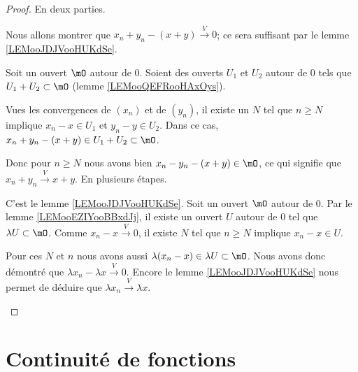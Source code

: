 \begin{proof}
	En deux parties.
	\begin{subproof}
		\spitem[\ref{ITEMooSHPAooQyEkgT}]
		Nous allons montrer que \( x_n+y_n-(x+y)\stackrel{V}{\longrightarrow}0\); ce sera suffisant par le lemme \ref{LEMooJDJVooHUKdSe}.

		Soit un ouvert \( \mO\) autour de \( 0\). Soient des ouverts \( U_1\) et \( U_2\) autour de \( 0\) tels que \( U_1+U_2\subset \mO\) (lemme \ref{LEMooQEFRooHAxOys}).

		Vues les convergences de \( (x_n)\) et de \( (y_n)\), il existe un \( N\) tel que \( n\geq N\) implique \( x_n-x\in U_1\) et \( y_n-y\in U_2\). Dans ce cas, \( x_n+y_n-(x+y)\in U_1+U_2\subset \mO\).

		Donc pour \( n\geq N\) nous avons bien \( x_n-y_n-(x+y)\in \mO\), ce qui signifie que \( x_n+y_n\stackrel{V}{\longrightarrow}x+y\).
		\spitem[\ref{ITEMooYHHYooYATzWE}]
		En plusieurs étapes.
		\begin{subproof}
			C'est le lemme \ref{LEMooJDJVooHUKdSe}.
			Soit un ouvert \( \mO\) autour de \( 0\). Par le lemme \ref{LEMooEZIYooBBxdJj}, il existe un ouvert \( U\) autour de \( 0\) tel que \( \lambda U\subset \mO\). Comme \( x_n-x\stackrel{V}{\longrightarrow}0\), il existe \( N\) tel que \( n\geq N\) implique \( x_n-x\in U\).

			Pour ces \( N\) et \( n\) nous avons aussi \( \lambda (x_n-x)\in \lambda U\subset \mO\). Nous avons donc démontré que \( \lambda x_n-\lambda x\stackrel{V}{\longrightarrow}0\).
			\spitem[Conclusion]
			Encore le lemme \ref{LEMooJDJVooHUKdSe} nous permet de déduire que \( \lambda x_n\stackrel{V}{\longrightarrow}\lambda x\).
		\end{subproof}
	\end{subproof}
\end{proof}

\section{Continuité de fonctions}

